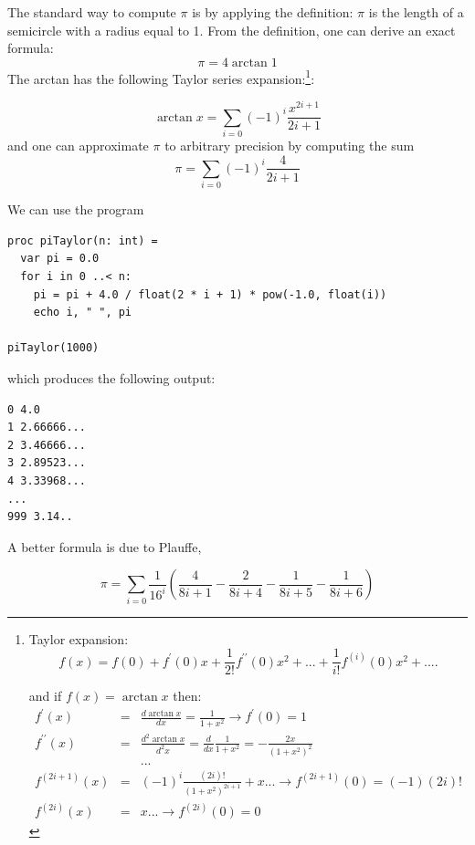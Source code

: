 \documentclass[justified, sixbynine]{tufte-book}
\theoremstyle{plain}%
\newtheorem * {corollary}{Corollary}
\theoremstyle{definition}
\theoremstyle{remark}
\newtheorem * {remark}{Remark}
\newtheorem * {note}{Note}
\begin{document}
\begin{fullwidth}
The standard way to compute $\pi $ is by applying the definition: $\pi $ is
the length of a semicircle with a radius equal to 1. From the definition, one can
derive an exact formula:
\begin{equation}
\pi =4\arctan 1
\end{equation}
The arctan has the following Taylor series expansion:\footnote{%
Taylor expansion:
\begin{equation}
f(x)=f(0)+f^{\prime }(0)x+\frac 1{2!}f^{\prime \prime }(0)x^2+...+\frac
1{i!}f^{(i)}(0)x^2+....
\end{equation}
\par
and if $f(x)=\arctan x$ then:
\begin{eqnarray}
f^{\prime }(x) &=&\frac{d\arctan x}{dx}=\frac 1{1+x^2}\rightarrow f^{\prime
}(0)=1 \\
f^{\prime \prime }(x) &=&\frac{d^2\arctan x}{d^2x}=\frac d{dx}\frac
1{1+x^2}=-\frac{2x}{(1+x^2)^2} \\
&&... \\
f^{(2i+1)}(x) &=&(-1)^i\frac{(2i)!}{(1+x^2)^{2i+1}}+x...\rightarrow
f^{(2i+1)}(0)=(-1)(2i)! \\
f^{(2i)}(x) &=&x...\rightarrow f^{(2i)}(0)=0
\end{eqnarray}
}:

\begin{equation}
\arctan x=\allowbreak \sum_{i=0}(-1)^i\frac{x^{2i+1}}{2i+1}
\end{equation}
and one can approximate $\pi $ to arbitrary precision by computing the sum
\begin{equation}
\pi =\allowbreak \sum_{i=0}(-1)^i\frac 4{2i+1}
\end{equation}

We can use the program
\begin{lstlisting}
proc piTaylor(n: int) =
  var pi = 0.0
  for i in 0 ..< n:
    pi = pi + 4.0 / float(2 * i + 1) * pow(-1.0, float(i))
    echo i, " ", pi

piTaylor(1000)
\end{lstlisting}

which produces the following output:
\begin{lstlisting}
0 4.0
1 2.66666...
2 3.46666...
3 2.89523...
4 3.33968...
...
999 3.14..
\end{lstlisting}

A better formula is due to Plauffe, 

\begin{equation}
\pi = \sum_{i=0} \frac{1}{16^i} \left(
\frac{4}{8i+1}-\frac{2}{8i+4}-\frac{1}{8i+5}-\frac{1}{8i+6}
\right)
\end{equation}


\end{fullwidth}
\end{document}
